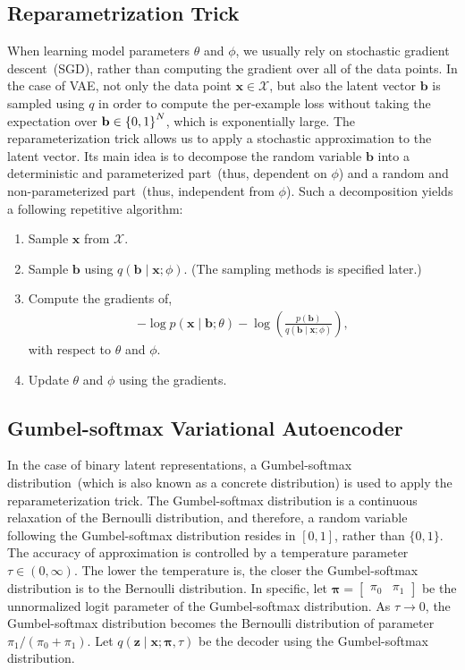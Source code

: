 \documentclass[10pt,letterpaper]{article}
\newcommand{\bx}{\mathbf{x}}
\newcommand{\bz}{\mathbf{z}}
\begin{document}
\subsection{Reparametrization Trick}
When learning model parameters $\theta$ and $\phi$, we usually rely on stochastic gradient descent~(SGD), rather than computing the gradient over all of the data points.
In the case of VAE, not only the data point $\mathbf{x}\in \mathcal{X}$, but also the latent vector $\mathbf{b}$ is sampled using $q$ in order to compute the per-example loss without taking the expectation over $\mathbf{b} \in {\left\{0,1\right\}}^N$, which is exponentially large.
The reparameterization trick allows us to apply a stochastic approximation to the latent vector.
Its main idea is to decompose the random variable $\mathbf{b}$ into a deterministic and parameterized part~(thus, dependent on $\phi$) and a random and non-parameterized part~(thus, independent from $\phi$).
Such a decomposition yields a following repetitive algorithm:
\begin{enumerate}
 \item Sample $\mathbf{x}$ from $\mathcal{X}$.
\item Sample $\mathbf{b}$ using $q(\mathbf{b} \mid \mathbf{x} ;\phi)$. (The sampling methods is specified later.)
 \item Compute the gradients of,
       \begin{align}
	\label{eq:stochastic-approx}
	-\log p(\mathbf{x} \mid \mathbf{b};\theta) - \log\left(\frac{p(\mathbf{b})}{q(\mathbf{b} \mid \mathbf{x};\phi)}\right),
       \end{align}
       with respect to $\theta$ and $\phi$.
 \item Update $\theta$ and $\phi$ using the gradients.
\end{enumerate}

\subsection{Gumbel-softmax Variational Autoencoder}
In the case of binary latent representations, a Gumbel-softmax distribution~(which is also known as a concrete distribution) is used to apply the reparameterization trick.
The Gumbel-softmax distribution is a continuous relaxation of the Bernoulli distribution, and therefore,
a random variable following the Gumbel-softmax distribution resides in $[0,1]$, rather than $\{0,1\}$.
The accuracy of approximation is controlled by a temperature parameter $\tau\in(0,\infty)$.
The lower the temperature is, the closer the Gumbel-softmax distribution is to the Bernoulli distribution.
In specific, let $\bm{\pi}=\begin{bmatrix}\pi_0 & \pi_1\end{bmatrix}$ be the unnormalized logit parameter of the Gumbel-softmax distribution.
As $\tau\rightarrow 0$, the Gumbel-softmax distribution becomes the Bernoulli distribution of parameter $\pi_1/(\pi_0 + \pi_1)$.
Let $q(\bz \mid \bx;\bm{\pi},\tau)$ be the decoder using the Gumbel-softmax distribution.
\end{document}
